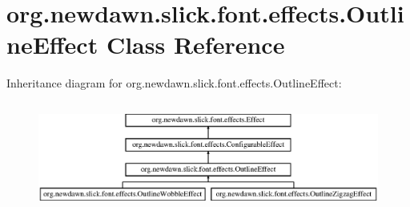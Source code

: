 \hypertarget{classorg_1_1newdawn_1_1slick_1_1font_1_1effects_1_1_outline_effect}{}\section{org.\+newdawn.\+slick.\+font.\+effects.\+Outline\+Effect Class Reference}
\label{classorg_1_1newdawn_1_1slick_1_1font_1_1effects_1_1_outline_effect}
Inheritance diagram for org.\+newdawn.\+slick.\+font.\+effects.\+Outline\+Effect\+:\begin{figure}[H]
\begin{center}
\leavevmode
\includegraphics[height=3.601286cm]{classorg_1_1newdawn_1_1slick_1_1font_1_1effects_1_1_outline_effect}
\end{center}
\end{figure}
